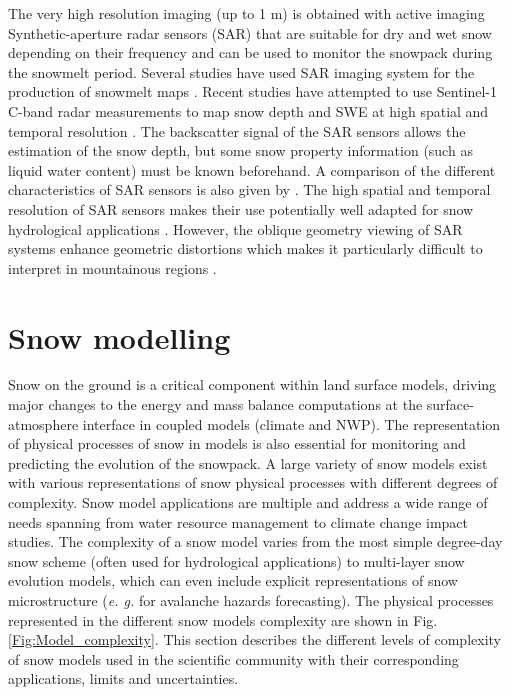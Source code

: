 \documentclass[utf8]{frontiersSCNS} %
\begin{document}
The very high resolution imaging (up to 1 m) is obtained with active imaging Synthetic-aperture radar sensors (SAR) that are suitable for dry and wet snow depending on their frequency and can be used to monitor the snowpack during the snowmelt period. Several studies have used SAR imaging system for the production of snowmelt maps  \citep{Shi_1994,Eckerstorfer_2016}. Recent studies have attempted to use Sentinel-1 C-band radar measurements to map snow depth and SWE at high spatial and temporal resolution \citep{Lievens_2018}. The backscatter signal of the SAR sensors allows the estimation of the snow depth, but some snow property information (such as liquid water content) must be known beforehand. A comparison of the different characteristics of SAR sensors is also given by \citet{Konig_2001}. The high spatial and temporal resolution of SAR sensors makes their use potentially well adapted for snow hydrological applications \citep{Bernier_1998,Nagler_2000,Leinss_2014,Rondeau_2016}. However, the oblique geometry viewing of SAR systems enhance geometric distortions which makes it particularly difficult to interpret in mountainous regions \citep{Veyssiere_2019}. 






\section{Snow modelling}

Snow on the ground is a critical component within land surface models, driving major changes to the energy and mass balance computations at the surface-atmosphere interface in coupled models (climate and NWP). The representation of physical processes of snow in models is also essential for monitoring and predicting the evolution of the snowpack. A large variety of snow models exist with various representations of snow physical processes with different degrees of complexity. Snow model applications are multiple and address a wide range of needs spanning from water resource management to climate change impact studies. The complexity of a snow model varies from the most simple degree-day snow scheme (often used for hydrological applications) to multi-layer snow evolution models, which can even include explicit representations of snow microstructure (\textit{e. g.} for avalanche hazards forecasting). The physical processes represented in the different snow models complexity are shown in Fig. \ref{Fig:Model_complexity}. This section describes the different levels of complexity of snow models used in the scientific community with their corresponding applications, limits and uncertainties.
\end{document}
